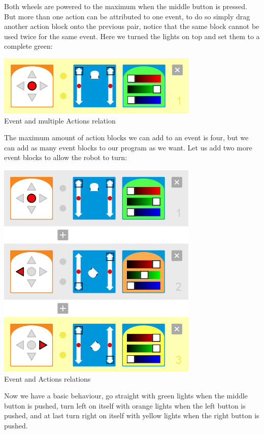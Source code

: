 \documentclass{scrartcl}
\begin{document}
Both wheels are powered to the maximum when the middle button is pressed. But more than one action can be attributed to one event, 
to do so simply drag another action block onto the previous pair, notice that the same block cannot be used twice for the same event. 
Here we turned the lights on top and set them to a complete green:\\
\begin{center}
  \includegraphics[scale=0.5]{./VPL/middlebtn_forward_green}\\
  Event and multiple Actions relation
\end{center}

The maximum amount of action blocks we can add to an event is four, but we can add as many event blocks to our program as we want. 
Let us add two more event blocks to allow the robot to turn:\\
\begin{center}
  \includegraphics[scale=0.5]{./VPL/middlebtn_3E}\\
  Event and Actions relations
\end{center}

Now we have a basic behaviour, go straight with green lights when the middle button is pushed, turn left on itself with orange lights when the left button is pushed, 
and at last turn right on itself with yellow lights when the right button is pushed.\\
\end{document}
